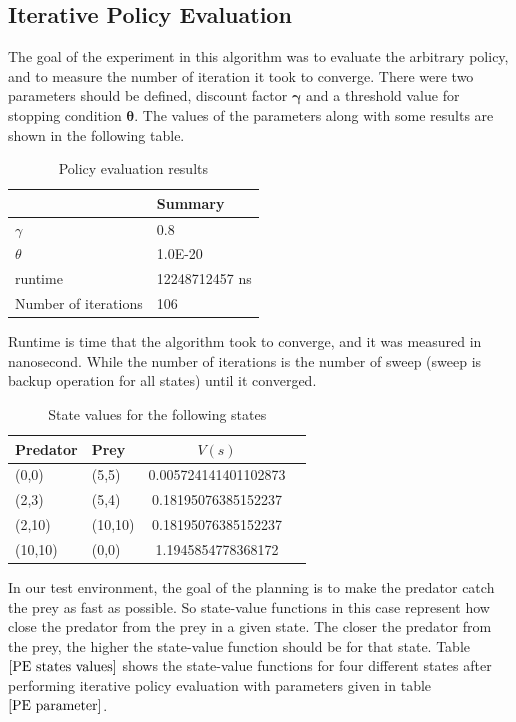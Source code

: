 \documentclass[paper=a4, fontsize=11pt]{scrartcl}
\numberwithin{equation}{section}		%
\numberwithin{figure}{section}			%
\numberwithin{table}{section}				%
\begin{document}
\subsection{Iterative Policy Evaluation}
The goal of the experiment in this algorithm was to evaluate the arbitrary policy, and to measure the number of iteration it took to converge. There were two parameters should be defined, discount factor $\mathbf{\gamma}$ and a threshold value for stopping condition $\mathbf{\theta}$. The values of the parameters along with some results are shown in the following table.
\begin{table}[H]
\caption{Policy evaluation results}
\label{PE parameter}
\centering
    \begin{tabular}{| l || l |}
    \hline
      & Summary \\ \hline
    $\gamma$ & 0.8 \\ \hline
    $\theta$ & 1.0E-20 \\ \hline
    runtime & 12248712457 ns \\ \hline
    Number of iterations & 106 \\
    \hline
    \end{tabular} 
\end{table}
Runtime is time that the algorithm took to converge, and it was measured in nanosecond. While the number of iterations is the number of sweep (sweep is backup operation for all states) until it converged.
\begin{table}[H]
\caption{State values for the following states}
\label{PE states values}
\centering
\begin{tabular}{| l  |  l || c | r |}
  \hline
  Predator & Prey & $V(s)$ \\ \hline
  (0,0) & (5,5) & 0.005724141401102873 \\ \hline
  (2,3) & (5,4) & 0.18195076385152237 \\ \hline
  (2,10) & (10,10) & 0.18195076385152237 \\ \hline
  (10,10) & (0,0) & 1.1945854778368172 \\
  \hline  
\end{tabular}
\end{table}
In our test environment, the goal of the planning is to make the predator catch the prey as fast as possible. So state-value functions in this case represent how close the predator from the prey in a given state. The closer the predator from the prey, the higher the state-value function should be for that state. Table $\ref{PE states values}$ shows the state-value functions for four different states after performing iterative policy evaluation with parameters given in table $\ref{PE parameter}$.
\end{document}
